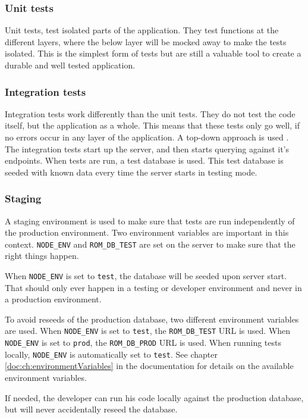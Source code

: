 \subsubsection{Unit tests}
Unit tests, test isolated parts of the application. 
They test functions at the different layers, where the below layer will be mocked away to make the tests isolated.
This is the simplest form of tests but are still a valuable tool to create a durable and well tested application.

\subsubsection{Integration tests}
Integration tests work differently than the unit tests. 
They do not test the code itself, but the application as a whole. 
This means that these tests only go well, if no errors occur in any layer of the application. 
A top-down approach is used \citep[pp. 662-669]{testing:integration}.
The integration tests start up the  server, and then starts querying against it's endpoints. 
When tests are run, a test database is used. This test database is seeded with known data every time the server starts in testing mode.

\subsubsection{Staging}
\label{sec:staging}
A staging environment is used to make sure that tests are run independently of the production environment. 
Two environment variables are important in this context.
\verb+NODE_ENV+ and \verb+ROM_DB_TEST+ are set on the  server to make sure that the right things happen.

When \verb+NODE_ENV+ is set to \verb+test+, the database will be seeded upon server start.
That should only ever happen in a testing or developer environment and never in a production environment.

To avoid reseeds of the production database, two different environment variables are used.
When \verb+NODE_ENV+ is set to \verb+test+, the \verb+ROM_DB_TEST+ URL is used. 
When \verb+NODE_ENV+ is set to \verb+prod+, the \verb+ROM_DB_PROD+ URL is used. 
When running tests locally, \verb+NODE_ENV+ is automatically set to \verb+test+.
See chapter \ref{doc:ch:environmentVariables} in the documentation for details on the available environment variables.

If needed, the developer can run his code locally against the production database, but will never accidentally reseed the database.


